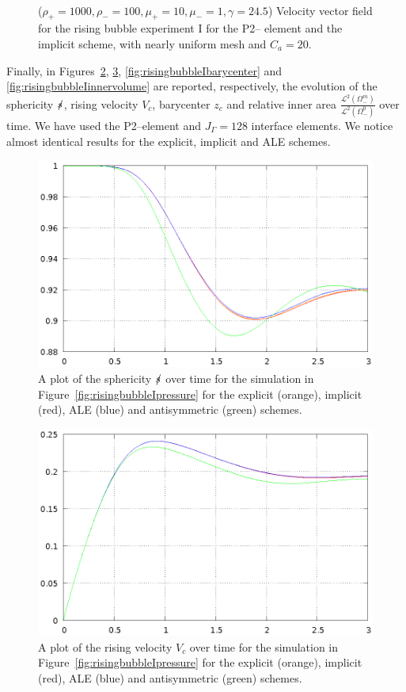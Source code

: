 \begin{figure}[htbp]
\centering
{}
\\
\caption[Navier--Stokes rising bubble I velocity]
{($\rho_+ = 1000,\rho_- = 100,\mu_+ = 10,\mu_- =1,\gamma = 24.5$)
Velocity vector field for the rising bubble experiment I for the P2--\pdg
element and the implicit scheme, with nearly uniform mesh and
$C_a=20$\textdegree.}
\label{fig:risingbubbleIvelocity}
\end{figure}

Finally, in Figures~\ref{fig:risingbubbleIsphericity},
\ref{fig:risingbubbleIrisingvelocity}, \ref{fig:risingbubbleIbarycenter} and
\ref{fig:risingbubbleIinnervolume} are reported, respectively, the evolution of
the sphericity $\mbox{$s\!\!\!\!\:/$}$, rising velocity $V_c$, barycenter $z_c$ and relative
inner area $\frac{\mathcal{L}^2(\Omega^m_-)}{\mathcal{L}^2(\Omega^0_-)}$ over
time. We have used the P2--\pdg element and $J_\Gamma=128$ interface elements.
We notice almost identical results for the explicit, implicit and ALE schemes.
\begin{figure}[htbp]
\centering
\includegraphics[width=.45\textwidth]
{figures/navier_stokes/rising_bubble_I_sphericity.ps}
\caption[Navier--Stokes rising bubble I sphericity]
{A plot of the sphericity $\mbox{$s\!\!\!\!\:/$}$ over time for the simulation in
Figure~\ref{fig:risingbubbleIpressure} for the explicit (orange), implicit
(red), ALE (blue) and antisymmetric (green) schemes.}
\label{fig:risingbubbleIsphericity}
\end{figure}

\begin{figure}[htbp]
\centering
\includegraphics[width=.45\textwidth]
{figures/navier_stokes/rising_bubble_I_rising_velocity.ps}
\caption[Navier--Stokes rising bubble I rising velocity]
{A plot of the rising velocity $V_c$ over time for the simulation in
Figure~\ref{fig:risingbubbleIpressure} for the explicit (orange), implicit
(red), ALE (blue) and antisymmetric (green) schemes.}
\label{fig:risingbubbleIrisingvelocity}
\end{figure}

